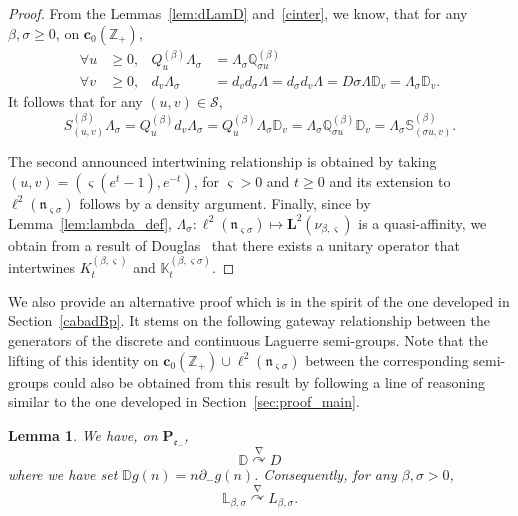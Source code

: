 \documentclass[10pt]{amsart}
\newtheorem{lemm}[theo]{Lemma}\newtheorem{prop}[theo]{Proposition}\newtheorem{coro}[theo]{Corollary}\newtheorem{conj}[theo]{Conjecture}
\theoremstyle{definition}\newtheorem{defi}[theo]{Definition}\newtheorem{rema}[theo]{Remark}\newtheorem{exam}[theo]{Example}\newtheorem{exem}[theo]{Example}\newtheorem{nota}[theo]{Notation}
\newcommand{\cS}{{\mathcal S}}
\newcommand{\ZZ}{\mathbb{Z}}
\newcommand{\fe}{\mathfrak{e}}
\newcommand{\fn}{\mathfrak{n}}
\newcommand{\na}{\nabla}
\newcommand{\dBs}{{\discret{Q}}}
\newcommand{\Bs}{Q}
\newcommand{\dLs}{{\discret{K}}}
\newcommand{\Ls}{K}
\newcommand{\esP}{\mathbf{P}}
\newcommand{\esL}{\mathbf{L}}
\newcommand{\esLd}{\ell}
\newcommand{\esc}{\mathbf{c}}
\newcommand{\discret}[1]{\mathds{#1}}
\newcommand{\cont}[1]{{#1}}
\newcommand{\Gate}[3]{#1\stackrel{#2}{\curvearrowright}#3}
\let\oldforall\forall
\renewcommand*{\forall}{\mathrel{\oldforall}}
\begin{document}
\begin{proof}
From the Lemmas~\ref{lem:dLamD} and~\ref{cinter}, we know, that for any $\beta,\sigma\geq 0$, on $\esc_0(\ZZ_+)$,
\[
\begin{aligned}
\forall u&\geq 0,& \Bs_u^{(\beta)}\Lambda_\sigma &= \Lambda_\sigma \dBs^{(\beta)}_{\sigma u}\\
\forall v&\geq 0,& d_v\Lambda_\sigma &= d_vd_\sigma\Lambda =d_\sigma d_v\Lambda =D\sigma\Lambda\discret{D}_v = \Lambda_\sigma\discret{D}_v.
\end{aligned}
\]
It follows that for any $(u,v)\in \cS$,
\[
S_{(u,v)}^{(\beta)}\Lambda_\sigma=\Bs_u^{(\beta)}d_v\Lambda_\sigma=\Bs_u^{(\beta)}\Lambda_\sigma\discret{D}_v=\Lambda_\sigma\dBs_{\sigma u}^{(\beta)}\discret{D}_v =\Lambda_\sigma\discret{S}^{(\beta)}_{(\sigma u,v)}.
\]

The second announced intertwining relationship is obtained by taking $(u,v)=(\varsigma(e^{t}-1), e^{-t})$, for $\varsigma>0$ and $t\geq 0$ and its extension to $ \esLd^2(\fn_{\varsigma \sigma})$ follows by a density argument. Finally, since by Lemma~\ref{lem:lambda_def}, $\Lambda_{\sigma}: \esLd^2(\fn_{\varsigma \sigma}) \mapsto \esL^2(\nu_{\beta,\varsigma})$ is a quasi-affinity, we obtain from a result of Douglas~\cite{Douglas} that there exists a unitary operator that intertwines $\Ls_{t}^{(\beta,\varsigma)}$ and $\dLs_{t}^{(\beta,\varsigma\sigma)}$.
\end{proof}

We also provide an alternative proof which is in the spirit of the one developed in Section~\ref{cabadBp}. It stems on the following gateway relationship between the generators of the discrete and continuous Laguerre semi-groups. Note that the lifting of this identity on $\esc_0(\ZZ_+) \cup \esLd^2(\fn_{\varsigma \sigma})$ between the corresponding semi-groups could also be obtained from this result by following a line of reasoning similar to the one developed in Section~\ref{sec:proof_main}.

\begin{lemm}\label{lem:inter_xpart}
We have, on $\esP_{\fe_{-}}$,
\begin{equation*}
\Gate{ \discret{D}}{\na}{ D}
\end{equation*}
where we have set $\discret{D}g (n)= n \partial_-g (n)$. Consequently, for any $\beta,\sigma>0$,
\begin{equation*}
\Gate{\discret{L}_{\beta,\sigma} }{\na}{\cont{L}_{\beta,\sigma}}.
\end{equation*}
\end{lemm}
\end{document}
